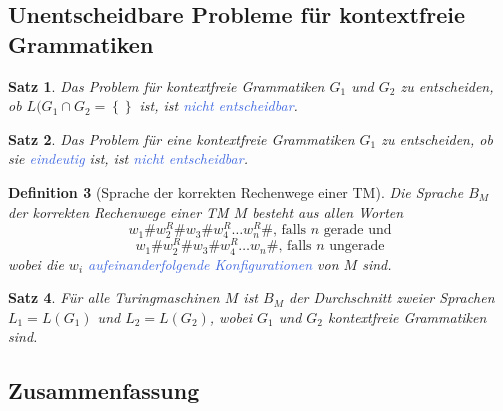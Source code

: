 \documentclass[11pt]{article}
\newcommand{\tcol}[1]{\textcolor{RoyalBlue}{#1}}
\newcommand{\set}[1]{\left\lbrace #1\right\rbrace}
\theoremstyle{break}
\newtheorem{satz}{Satz}[section]
\newtheorem{defi}[satz]{Definition}
\begin{document}
\subsection{Unentscheidbare Probleme für kontextfreie Grammatiken}

\begin{satz}
Das Problem für kontextfreie Grammatiken $G_1$ und $G_2$ zu entscheiden, ob $L(G_1\cap G_2=\set{}$ ist, ist \tcol{nicht entscheidbar}.
\end{satz}

\begin{satz}
Das Problem für eine kontextfreie Grammatiken $G_1$ zu entscheiden, ob sie \tcol{eindeutig} ist, ist \tcol{nicht entscheidbar}.
\end{satz}

\begin{defi}[Sprache der korrekten Rechenwege einer TM]
Die Sprache $B_M$ der korrekten Rechenwege einer TM $M$ besteht aus allen Worten
\[w_1\#w_2^R\#w_3\#w_4^R\dots w_n^R\#\text{, falls $n$ gerade und}\]
\[w_1\#w_2^R\#w_3\#w_4^R\dots w_n\#\text{, falls $n$ ungerade}\]
wobei die $w_i$ \tcol{aufeinanderfolgende Konfigurationen} von $M$ sind.
\end{defi}

\begin{satz}
Für alle Turingmaschinen $M$ ist $B_M$ der Durchschnitt zweier Sprachen $L_1=L(G_1)$ und $L_2=L(G_2)$, wobei $G_1$ und $G_2$ kontextfreie Grammatiken sind.
\end{satz}


\subsection{Zusammenfassung}
\end{document}
